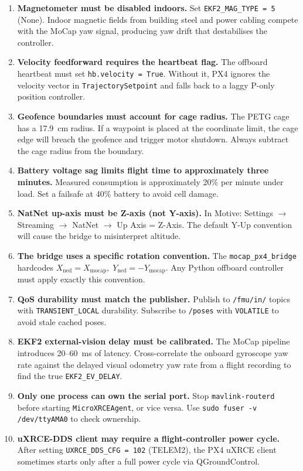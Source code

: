 \begin{enumerate}
    \item \textbf{Magnetometer must be disabled indoors.} Set \texttt{EKF2\_MAG\_TYPE = 5} (None). Indoor magnetic fields from building steel and power cabling compete with the MoCap yaw signal, producing yaw drift that destabilises the controller.

    \item \textbf{Velocity feedforward requires the heartbeat flag.} The offboard heartbeat must set \texttt{hb.velocity = True}. Without it, PX4 ignores the velocity vector in \texttt{TrajectorySetpoint} and falls back to a laggy P-only position controller.

    \item \textbf{Geofence boundaries must account for cage radius.} The PETG cage has a 17.9~cm radius. If a waypoint is placed at the coordinate limit, the cage edge will breach the geofence and trigger motor shutdown. Always subtract the cage radius from the boundary.

    \item \textbf{Battery voltage sag limits flight time to approximately three minutes.} Measured consumption is approximately 20\% per minute under load. Set a failsafe at 40\% battery to avoid cell damage.

    \item \textbf{NatNet up-axis must be Z-axis (not Y-axis).} In Motive: Settings $\to$ Streaming $\to$ NatNet $\to$ Up Axis = Z-Axis. The default Y-Up convention will cause the bridge to misinterpret altitude.

    \item \textbf{The bridge uses a specific rotation convention.} The \texttt{mocap\_px4\_bridge} hardcodes $X_{\mathrm{ned}} = X_{\mathrm{mocap}},\; Y_{\mathrm{ned}} = -Y_{\mathrm{mocap}}$. Any Python offboard controller must apply exactly this convention.

    \item \textbf{QoS durability must match the publisher.} Publish to \texttt{/fmu/in/} topics with \texttt{TRANSIENT\_LOCAL} durability. Subscribe to \texttt{/poses} with \texttt{VOLATILE} to avoid stale cached poses.

    \item \textbf{EKF2 external-vision delay must be calibrated.} The MoCap pipeline introduces 20--60~ms of latency. Cross-correlate the onboard gyroscope yaw rate against the delayed visual odometry yaw rate from a flight recording to find the true \texttt{EKF2\_EV\_DELAY}.

    \item \textbf{Only one process can own the serial port.} Stop \texttt{mavlink-routerd} before starting \texttt{MicroXRCEAgent}, or vice versa. Use \texttt{sudo fuser -v /dev/ttyAMA0} to check ownership.

    \item \textbf{uXRCE-DDS client may require a flight-controller power cycle.} After setting \texttt{UXRCE\_DDS\_CFG = 102} (TELEM2), the PX4 uXRCE client sometimes starts only after a full power cycle via QGroundControl.
\end{enumerate}
\endinput
